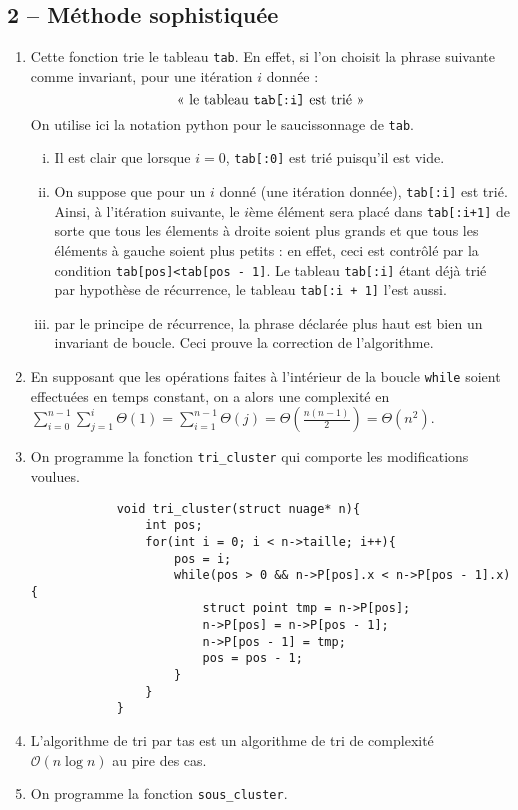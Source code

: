 \documentclass[10pt]{article}
\newcommand{\f}[1]{\texttt{#1}}
\begin{document}
	\subsection*{2 – Méthode sophistiquée}
	\begin{enumerate}[start=4,label={\bfseries Question \arabic*}]
		\item Cette fonction trie le tableau \f{tab}. En effet, si l'on choisit la phrase suivante comme invariant, pour une itération $i$ donnée : \[\text{« le tableau \f{tab[:i]} est trié »}\]
		On utilise ici la notation python pour le saucissonnage de \f{tab}.
		\begin{enumerate}[i)]
			\item Il est clair que lorsque $i=0$, \f{tab[:0]} est trié puisqu'il est vide.
			\item On suppose que pour un $i$ donné (une itération donnée), \f{tab[:i]} est trié. Ainsi, à l'itération suivante, le $i$ème élément sera placé dans \f{tab[:i+1]} de sorte que tous les élements à droite soient plus grands et que tous les éléments à gauche soient plus petits : en effet, ceci est contrôlé par la condition \f{tab[pos]<tab[pos - 1]}. Le tableau \f{tab[:i]} étant déjà trié par hypothèse de récurrence, le tableau \f{tab[:i + 1]} l'est aussi.
			\item par le principe de récurrence, la phrase déclarée plus haut est bien un invariant de boucle. Ceci prouve la correction de l'algorithme.
		\end{enumerate} 
		\item En supposant que les opérations faites à l'intérieur de la boucle \f{while} soient effectuées en temps constant, on a alors une complexité en $\sum_{i=0}^{n - 1}\sum_{j=1}^i\Theta(1)=\sum_{i=1}^{n-1}\Theta(j)=\Theta\left(\frac{n(n-1)}2\right)=\Theta(n^2)$.
		\item On programme la fonction \f{tri\_cluster} qui comporte les modifications voulues.
		\begin{lstlisting}
			void tri_cluster(struct nuage* n){
				int pos;
				for(int i = 0; i < n->taille; i++){
					pos = i;
					while(pos > 0 && n->P[pos].x < n->P[pos - 1].x){
						struct point tmp = n->P[pos];
						n->P[pos] = n->P[pos - 1];
						n->P[pos - 1] = tmp;
						pos = pos - 1;
					}
				}
			}
		\end{lstlisting}
		\item L'algorithme de tri par tas est un algorithme de tri de complexité $\mathcal O(n\log n)$ au pire des cas.
		\item On programme la fonction \f{sous\_cluster}.

\end{enumerate}
\end{document}
